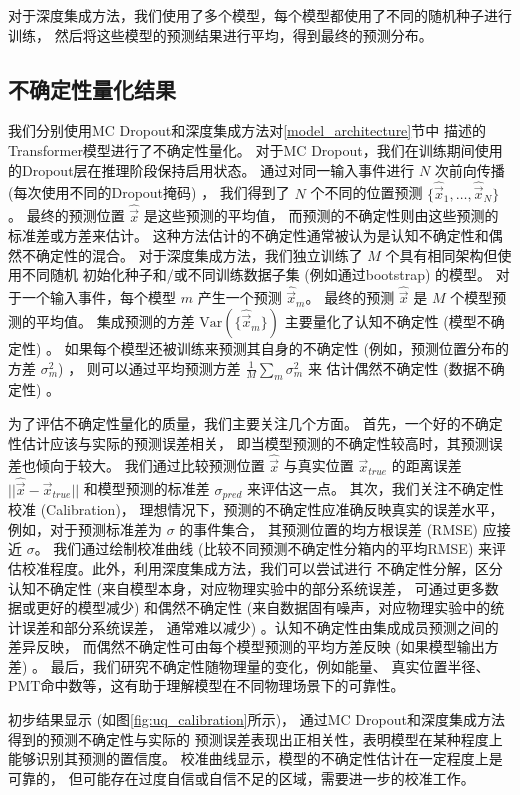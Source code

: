 对于深度集成方法，我们使用了多个模型，每个模型都使用了不同的随机种子进行训练，
然后将这些模型的预测结果进行平均，得到最终的预测分布。

\subsection{不确定性量化结果}

我们分别使用MC Dropout和深度集成方法对\ref{model_architecture}节中
描述的Transformer模型进行了不确定性量化。
对于MC Dropout，我们在训练期间使用的Dropout层在推理阶段保持启用状态。
通过对同一输入事件进行 $N$ 次前向传播 (每次使用不同的Dropout掩码) ，
我们得到了 $N$ 个不同的位置预测 
$\{\hat{\vec{x}}_1, \dots, \hat{\vec{x}}_N\}$。
最终的预测位置 $\hat{\vec{x}}$ 是这些预测的平均值，
而预测的不确定性则由这些预测的标准差或方差来估计。
这种方法估计的不确定性通常被认为是认知不确定性和偶然不确定性的混合。
对于深度集成方法，我们独立训练了 $M$ 个具有相同架构但使用不同随机
初始化种子和/或不同训练数据子集 (例如通过bootstrap) 的模型。
对于一个输入事件，每个模型 $m$ 产生一个预测 $\hat{\vec{x}}_m$。
最终的预测 $\hat{\vec{x}}$ 是 $M$ 个模型预测的平均值。
集成预测的方差 $\text{Var}(\{\hat{\vec{x}}_m\})$ 
主要量化了认知不确定性 (模型不确定性) 。
如果每个模型还被训练来预测其自身的不确定性
 (例如，预测位置分布的方差 $\sigma_m^2$) ，
则可以通过平均预测方差 $\frac{1}{M}\sum_m \sigma_m^2$ 来
估计偶然不确定性 (数据不确定性) 。

为了评估不确定性量化的质量，我们主要关注几个方面。
首先，一个好的不确定性估计应该与实际的预测误差相关，
即当模型预测的不确定性较高时，其预测误差也倾向于较大。
我们通过比较预测位置 $\hat{\vec{x}}$ 与真实位置 
$\vec{x}_{true}$ 的距离误差 $||\hat{\vec{x}} - \vec{x}_{true}||$ 
和模型预测的标准差 $\sigma_{pred}$ 来评估这一点。
其次，我们关注不确定性校准 (Calibration)，
理想情况下，预测的不确定性应准确反映真实的误差水平，
例如，对于预测标准差为 $\sigma$ 的事件集合，
其预测位置的均方根误差 (RMSE) 应接近 $\sigma$。
我们通过绘制校准曲线 (比较不同预测不确定性分箱内的平均RMSE) 
来评估校准程度。此外，利用深度集成方法，我们可以尝试进行
不确定性分解，区分认知不确定性 
(来自模型本身，对应物理实验中的部分系统误差，
可通过更多数据或更好的模型减少) 和偶然不确定性 
(来自数据固有噪声，对应物理实验中的统计误差和部分系统误差，
通常难以减少) 。认知不确定性由集成成员预测之间的差异反映，
而偶然不确定性可由每个模型预测的平均方差反映 (如果模型输出方差) 。
最后，我们研究不确定性随物理量的变化，例如能量、
真实位置半径、PMT命中数等，这有助于理解模型在不同物理场景下的可靠性。

初步结果显示 (如图\ref{fig:uq_calibration}所示)，
通过MC Dropout和深度集成方法得到的预测不确定性与实际的
预测误差表现出正相关性，表明模型在某种程度上能够识别其预测的置信度。
校准曲线显示，模型的不确定性估计在一定程度上是可靠的，
但可能存在过度自信或自信不足的区域，需要进一步的校准工作。

